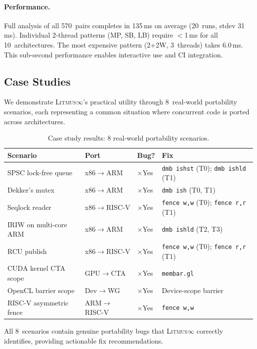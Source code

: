 \documentclass[10pt]{article}
\newcommand{\litmus}{\textsc{Litmus$\infty$}}
\newcommand{\xmark}{$\times$}
\begin{document}
\paragraph{Performance.}
Full analysis of all 570~pairs completes in 135\,ms on average
(20~runs, stdev 31\,ms). Individual 2-thread patterns (MP, SB, LB)
require $<$1\,ms for all 10~architectures. The most expensive pattern
(2+2W, 3~threads) takes 6.0\,ms. This sub-second performance enables
interactive use and CI integration.

\subsection{Case Studies}
\label{sec:case-studies}

We demonstrate \litmus{}'s practical utility through 8~real-world
portability scenarios, each representing a common situation where
concurrent code is ported across architectures.

\begin{table}[h]
\centering
\caption{Case study results: 8 real-world portability scenarios.}
\label{tab:case-studies}
\small
\begin{tabular}{p{4cm}llp{5cm}}
\toprule
\textbf{Scenario} & \textbf{Port} & \textbf{Bug?} & \textbf{Fix} \\
\midrule
SPSC lock-free queue & x86$\to$ARM & \xmark Yes & \texttt{dmb ishst} (T0); \texttt{dmb ishld} (T1) \\
Dekker's mutex & x86$\to$ARM & \xmark Yes & \texttt{dmb ish} (T0, T1) \\
Seqlock reader & x86$\to$RISC-V & \xmark Yes & \texttt{fence w,w} (T0); \texttt{fence r,r} (T1) \\
IRIW on multi-core ARM & x86$\to$ARM & \xmark Yes & \texttt{dmb ishld} (T2, T3) \\
RCU publish & x86$\to$RISC-V & \xmark Yes & \texttt{fence w,w} (T0); \texttt{fence r,r} (T1) \\
CUDA kernel CTA scope & GPU$\to$CTA & \xmark Yes & \texttt{membar.gl} \\
OpenCL barrier scope & Dev$\to$WG & \xmark Yes & Device-scope barrier \\
RISC-V asymmetric fence & ARM$\to$RISC-V & \xmark Yes & \texttt{fence w,w} \\
\bottomrule
\end{tabular}
\end{table}

All 8~scenarios contain genuine portability bugs that \litmus{} correctly
identifies, providing actionable fix recommendations.
\end{document}
